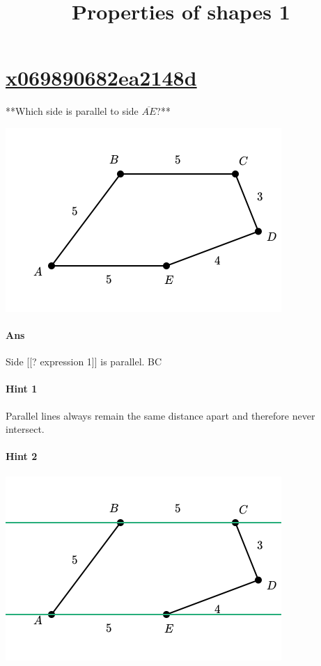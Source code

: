 \documentclass[twocolumn,10pt]{article}
\title{Properties of shapes 1}
\def\shrinkfactor{0.55}
\begin{document}
\maketitle



\section{\href{https://www.khanacademy.org/devadmin/content/items/x069890682ea2148d}{x069890682ea2148d}}

\noindent
**Which side is parallel to side $\overline{AE}$?**


\includegraphics[scale=\shrinkfactor]{figures/0b1f52e2d56a98d5ec5f552c02f22f067ec40078.png}

\paragraph{Ans} Side [[? expression 1]] is parallel.
  BC

\paragraph{Hint 1}Parallel lines always remain the same distance apart and therefore never intersect. 

\paragraph{Hint 2}
\includegraphics[scale=\shrinkfactor]{figures/83c724a031b6ec05f29446ad771043b503b36466.png}
\end{document}
